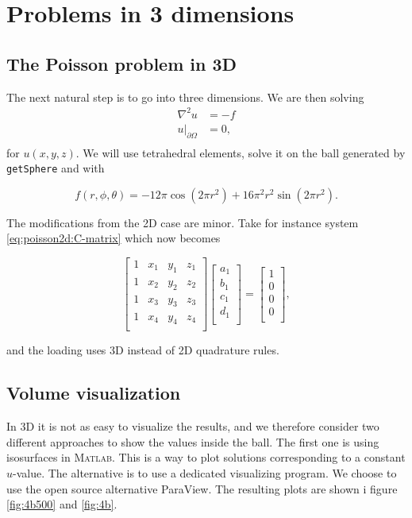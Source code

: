 \documentclass[paper=a4, fontsize=11pt]{scrartcl} %
\begin{document}
\section{Problems in 3 dimensions}
\subsection{The Poisson problem in 3D}
The next natural step is to go into three dimensions. We are then  solving
\begin{equation}
\begin{aligned}
\nabla^2 u 	&= -f \\
\left. u\right|_{\partial\Omega} 	&= 0, \\
\end{aligned}
\label{eq:poisson3d}
\end{equation}
for $u(x,y,z)$. We will use tetrahedral elements, solve it on the ball generated by \texttt{getSphere} and with

\[f(r,\phi,\theta) = -12\pi\cos(2\pi r^2) + 16\pi^2r^2\sin(2\pi r^2).\]

The modifications from the 2D case are minor. Take for instance system \eqref{eq:poisson2d:C-matrix} which now becomes

\[\begin{bmatrix}
  1 & x_1 & y_1 & z_1\\
  1 & x_2 & y_2 & z_2\\
  1 & x_3 & y_3 & z_3\\
  1 & x_4 & y_4 & z_4\\ \end{bmatrix}
\begin{bmatrix} a_1 \\ b_1\\ c_1 \\ d_1 \\ \end{bmatrix} =
\begin{bmatrix}
  1 \\ 0\\ 0 \\ 0 \\
\end{bmatrix},\]

and the loading uses 3D instead of 2D quadrature rules.
 
\subsection{Volume visualization}
In 3D it is not as easy to visualize the results, and we therefore consider two different approaches to show the values inside the ball. The first one is using isosurfaces in \textsc{Matlab}. This is a way to plot solutions corresponding to a constant $u$-value. The alternative is to use a dedicated visualizing program. We choose to use the open source alternative ParaView. The resulting plots are shown i figure \ref{fig:4b500} and \ref{fig:4b}.
\end{document}
